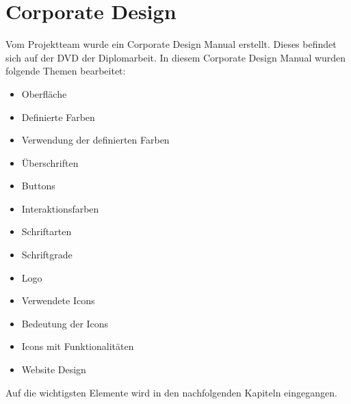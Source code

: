 \section{Corporate Design}
Vom Projektteam wurde ein Corporate Design Manual erstellt. Dieses befindet sich auf der DVD der Diplomarbeit. In diesem Corporate Design Manual wurden folgende Themen bearbeitet: 
\begin{itemize}
	\item Oberfläche
	\item Definierte Farben
	\item Verwendung der definierten Farben
	\item Überschriften
	\item Buttons 
	\item Interaktionsfarben
	\item Schriftarten
	\item Schriftgrade
	\item Logo
	\item Verwendete Icons
	\item Bedeutung der Icons 
	\item Icons mit Funktionalitäten 	
	\item Website Design

\end{itemize}
Auf die wichtigsten Elemente wird in den nachfolgenden Kapiteln eingegangen.
